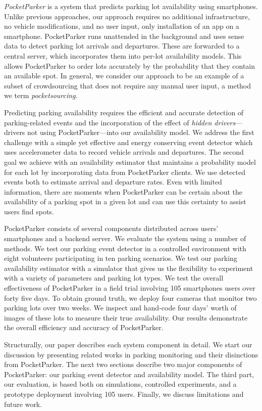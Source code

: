 \textit{PocketParker} is a system that predicts parking lot availability using
smartphones. Unlike previous approaches, our approach requires no additional
infrastructure, no vehicle modifications, and no user input, only installation
of an app on a smartphone.  PocketParker runs unattended in the background and
uses sense data to detect parking lot arrivals and departures.  These are
forwarded to a central server, which incorporates them into per-lot
availability models.  This allows PocketParker to order lots accurately by the
probability that they contain an available spot.  In general, we consider our
approach to be an example of a subset of crowdsourcing that does not require
any manual user input, a method we term \textit{pocketsourcing}.

Predicting parking availability requires the efficient and accurate detection
of parking-related events and the incorporation of the effect of
\textit{hidden drivers}---drivers not using PocketParker---into our
availability model. We address the first challenge with a simple yet effective
and energy conserving event detector which uses accelerometer data to record
vehicle arrivals and departures.  The second goal we achieve with an
availability estimator that maintains a probability model for each lot by
incorporating data from PocketParker clients. We use detected events both to
estimate arrival and departure rates.  Even with limited information, there
are moments when PocketParker can be certain about the availability of a
parking spot in a given lot and can use this certainty to assist users find
spots.

PocketParker consists of several components distributed across users'
smartphones and a backend server.  We evaluate the system using a number of
methods.  We test our parking event detector in a controlled environment
with eight volunteers participating in ten parking scenarios. We test our
parking availability estimator with a simulator that gives us the flexibility
to experiment with a variety of parameters and parking lot types.  We test the
overall effectiveness of PocketParker in a field trial involving 105
smartphones users over forty five days. To obtain ground truth, we deploy four
cameras that monitor two parking lots over two weeks. We inspect and hand-code
four days' worth of images of these lots to measure their true availability.
Our results demonstrate the overall efficiency and accuracy of PocketParker.

Structurally, our paper describes each system component in detail. We start
our discussion by presenting related works in parking monitoring and their
disinctions from PocketParker.  The next two sections describe two major
components of PocketParker: our parking event detector and availability model.
The third part, our evaluation, is based both on simulations, controlled
experiments, and a prototype deployment involving 105 users.  Finally, we
discuss limitations and future work.

